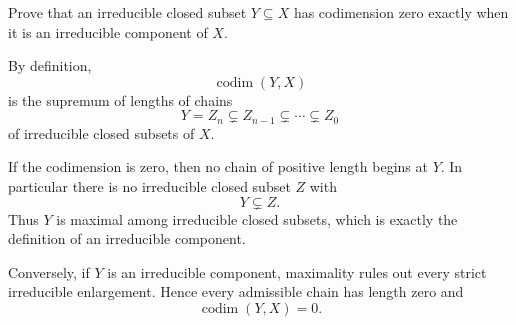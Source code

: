 \begin{problem}\label{prob:vi31-12}
Prove that an irreducible closed subset \(Y\subseteq X\) has codimension zero exactly when it is an irreducible component of \(X\).
\end{problem}

\ifdefined\FullProblemDossiers
\begin{solution}
By definition,
\[
\operatorname{codim}(Y,X)
\]
is the supremum of lengths of chains
\[
Y=Z_n\subsetneq Z_{n-1}\subsetneq\cdots\subsetneq Z_0
\]
of irreducible closed subsets of \(X\).

If the codimension is zero, then no chain of positive length begins at \(Y\). In particular there is no
irreducible closed subset \(Z\) with
\[
Y\subsetneq Z.
\]
Thus \(Y\) is maximal among irreducible closed subsets, which is exactly the definition of an irreducible
component.

Conversely, if \(Y\) is an irreducible component, maximality rules out every strict irreducible enlargement.
Hence every admissible chain has length zero and
\[
\boxed{\operatorname{codim}(Y,X)=0}.
\]
\end{solution}
\fi
